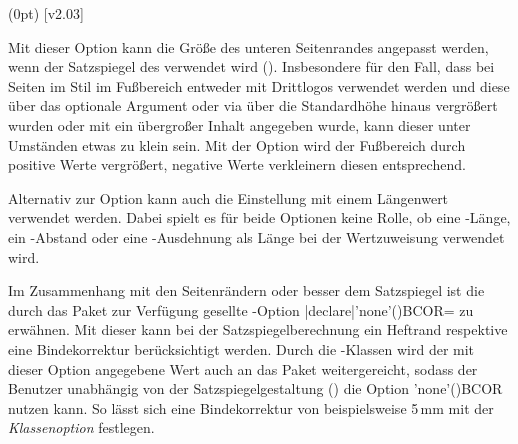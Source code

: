 \begin{DeclareEntity*}{}
\begin{DeclareEntity*}{}
\begin{DeclareEntity*}{}
\begin{Declaration}
  {}
  (0pt)
  [v2.03]
\printdeclarationlist

Mit dieser Option kann die Größe des unteren Seitenrandes angepasst werden, 
wenn der Satzspiegel des \CDs verwendet wird ().
Insbesondere für den Fall, dass bei Seiten im Stil  
im Fußbereich entweder mit  Drittlogos verwendet werden und 
diese über das optionale Argument oder via  über die 
Standardhöhe hinaus vergrößert wurden oder mit  ein 
übergroßer Inhalt angegeben wurde, kann dieser unter Umständen etwas zu klein 
sein. Mit der Option  wird der Fußbereich durch 
positive Werte vergrößert, negative Werte verkleinern diesen entsprechend. 

Alternativ zur Option  kann auch die Einstellung 
 mit einem Längenwert verwendet werden. Dabei spielt 
es für beide Optionen keine Rolle, ob eine -Länge, ein 
-Abstand oder eine -Ausdehnung als Länge bei der 
Wertzuweisung verwendet wird.
\end{Declaration}



Im Zusammenhang mit den Seitenrändern oder besser dem Satzspiegel ist die durch 
das Paket  zur Verfügung gesellte \KOMAScript-Option 
\Option|declare|'none'(){BCOR=} zu 
erwähnen. Mit dieser kann bei der Satzspiegelberechnung ein Heftrand respektive 
eine Bindekorrektur berücksichtigt werden. Durch die \TUDScript-Klassen wird 
der mit dieser Option angegebene Wert auch an das Paket  
weitergereicht, sodass der Benutzer unabhängig von der Satzspiegelgestaltung 
() die Option \Option'none'(){BCOR} nutzen 
kann. So lässt sich eine Bindekorrektur von beispielsweise 5\,mm mit der 
\emph{Klassenoption}  festlegen.


\end{DeclareEntity*}
\end{DeclareEntity*}
\end{DeclareEntity*}
